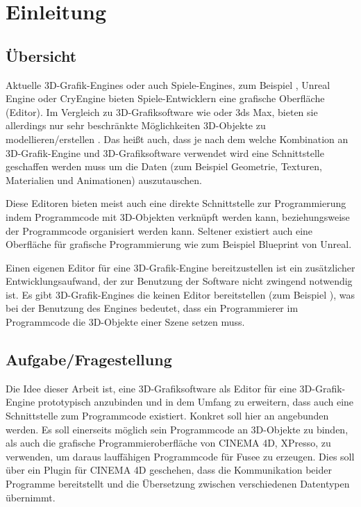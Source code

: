 \section{Einleitung}

\subsection{Übersicht}

Aktuelle 3D-Grafik-Engines oder auch Spiele-Engines, zum Beispiel , Unreal Engine oder CryEngine bieten Spiele-Entwicklern eine grafische Oberfläche (Editor). Im Vergleich zu 3D-Grafiksoftware wie  oder 3ds Max, bieten sie allerdings nur sehr beschränkte Möglichkeiten 3D-Objekte zu modellieren/erstellen \cite[S.54]{Gregory.2014}. Das heißt auch, dass je nach dem welche Kombination an 3D-Grafik-Engine und 3D-Grafiksoftware verwendet wird eine Schnittstelle geschaffen werden muss um die Daten (zum Beispiel Geometrie, Texturen, Materialien und Animationen) auszutauschen.

Diese Editoren bieten meist auch eine direkte Schnittstelle zur Programmierung indem Programmcode mit 3D-Objekten verknüpft werden kann, beziehungsweise der Programmcode organisiert werden kann. Seltener existiert auch eine Oberfläche für grafische Programmierung wie zum Beispiel Blueprint von Unreal.

Einen eigenen Editor für eine 3D-Grafik-Engine bereitzustellen ist ein zusätzlicher Entwicklungsaufwand, der zur Benutzung der Software nicht zwingend notwendig ist. Es gibt 3D-Grafik-Engines die keinen Editor bereitstellen (zum Beispiel ), was bei der Benutzung des Engines bedeutet, dass ein Programmierer im Programmcode die 3D-Objekte einer Szene setzen muss.

\subsection{Aufgabe/Fragestellung}

Die Idee dieser Arbeit ist, eine 3D-Grafiksoftware als Editor für eine 3D-Grafik-Engine prototypisch anzubinden und in dem Umfang zu erweitern, dass auch eine Schnittstelle zum Programmcode existiert. Konkret soll hier  an  angebunden werden. Es soll einerseits möglich sein Programmcode an 3D-Objekte zu binden, als auch die grafische Programmieroberfläche von CINEMA 4D, XPresso, zu verwenden, um daraus lauffähigen Programmcode für Fusee zu erzeugen. Dies soll über ein Plugin für CINEMA 4D geschehen, dass die Kommunikation beider Programme bereitstellt und die Übersetzung zwischen verschiedenen Datentypen übernimmt.

